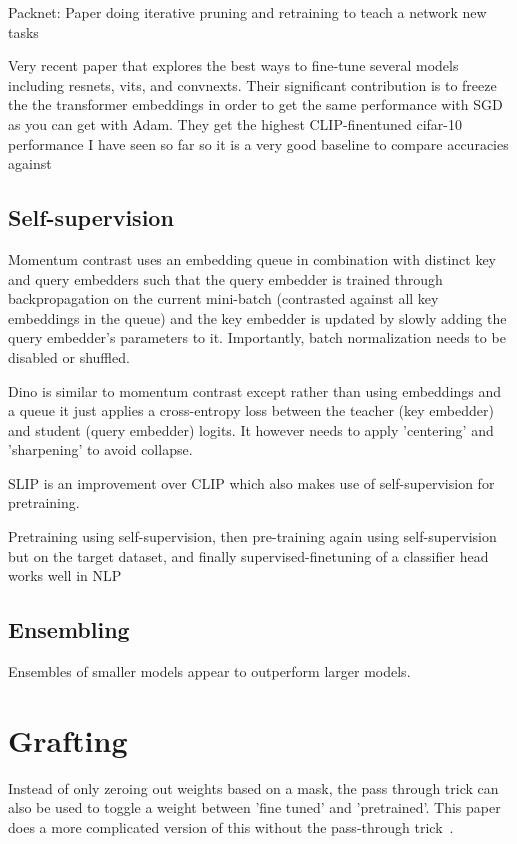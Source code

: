 \documentclass[12pt]{report}
\begin{document}
    Packnet: Paper doing iterative pruning and retraining to teach a network new tasks ~\cite{mallyaPackNetAddingMultiple2018}

    Very recent paper that explores the best ways to fine-tune several models including resnets, vits, and convnexts.
    Their significant contribution is to freeze the the transformer embeddings in order to get the same performance with SGD as you can get with Adam. They get the highest CLIP-finentuned cifar-10 performance I have seen so far so it is a very good baseline to compare accuracies against~\cite{kumarHowFineTuneVision2022}



    \section{Self-supervision}

    Momentum contrast uses an embedding queue in combination with distinct key and query embedders such that the query embedder is trained through backpropagation on the current mini-batch (contrasted against all key embeddings in the queue) and the key embedder is updated by slowly adding the query embedder's parameters to it. Importantly, batch normalization needs to be disabled or shuffled.~\cite{heMomentumContrastUnsupervised2020}

    Dino is similar to momentum contrast except rather than using embeddings and a queue it just applies a cross-entropy loss between the teacher (key embedder) and student (query embedder) logits. It however needs to apply 'centering' and 'sharpening' to avoid collapse.~\cite{caronEmergingPropertiesSelfSupervised2021a}

    SLIP is an improvement over CLIP which also makes use of self-supervision for pretraining.~\cite{muSLIPSelfsupervisionMeets2021}

    Pretraining using self-supervision, then pre-training again using self-supervision but on the target dataset, and finally supervised-finetuning of a classifier head works well in NLP~\cite{gururanganDonStopPretraining2020, howardUniversalLanguageModel2018}

    \section{Ensembling}
    Ensembles of smaller models appear to outperform larger models.~\cite{kondratyukWhenEnsemblingSmaller2020}

    \chapter{Grafting}
    Instead of only zeroing out weights based on a mask, the pass through trick can also be used to toggle a weight between 'fine tuned' and 'pretrained'. This paper does a more complicated version of this without the pass-through trick~\cite{panigrahiTaskSpecificSkillLocalization2023}.
    
\end{document}
